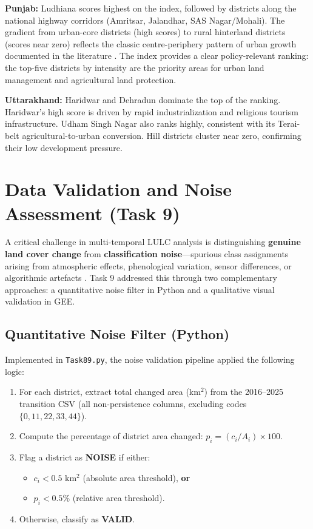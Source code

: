 \documentclass[12pt,a4paper]{article}
\begin{document}
\textbf{Punjab:} Ludhiana scores highest on the index, followed by districts along the national highway corridors (Amritsar, Jalandhar, SAS Nagar/Mohali). The gradient from urban-core districts (high scores) to rural hinterland districts (scores near zero) reflects the classic centre-periphery pattern of urban growth documented in the literature \citep{seto2011}. The index provides a clear policy-relevant ranking: the top-five districts by intensity are the priority areas for urban land management and agricultural land protection.

\textbf{Uttarakhand:} Haridwar and Dehradun dominate the top of the ranking. Haridwar's high score is driven by rapid industrialization and religious tourism infrastructure. Udham Singh Nagar also ranks highly, consistent with its Terai-belt agricultural-to-urban conversion. Hill districts cluster near zero, confirming their low development pressure.

\section{Data Validation and Noise Assessment (Task 9)}

A critical challenge in multi-temporal LULC analysis is distinguishing \textbf{genuine land cover change} from \textbf{classification noise}---spurious class assignments arising from atmospheric effects, phenological variation, sensor differences, or algorithmic artefacts \citep{foody2002status}. Task 9 addressed this through two complementary approaches: a quantitative noise filter in Python and a qualitative visual validation in GEE.

\subsection{Quantitative Noise Filter (Python)}

Implemented in \texttt{Task89.py}, the noise validation pipeline applied the following logic:

\begin{enumerate}
    \item For each district, extract total changed area (km$^2$) from the 2016--2025 transition CSV (all non-persistence columns, excluding codes $\{0, 11, 22, 33, 44\}$).
    \item Compute the percentage of district area changed: $p_i = (c_i / A_i) \times 100$.
    \item Flag a district as \textbf{NOISE} if either:
    \begin{itemize}
        \item $c_i < 0.5$ km$^2$ (absolute area threshold), \textbf{or}
        \item $p_i < 0.5\%$ (relative area threshold).
    \end{itemize}
    \item Otherwise, classify as \textbf{VALID}.
\end{enumerate}
\end{document}

